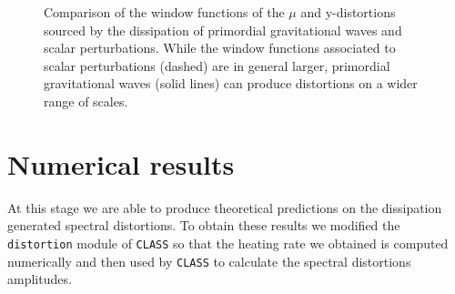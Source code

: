 \begin{figure}
    \centering
{}
\caption{Comparison of the window functions of the $\mu$ and y-distortions sourced by the dissipation of primordial gravitational waves and scalar perturbations. While the window functions associated to scalar perturbations (dashed) are in general larger, primordial gravitational waves (solid lines) can produce distortions on a wider range of scales.}
\label{fig:st_window}
\end{figure}

\section{Numerical results}\label{sec:num_results}
At this stage we are able to produce theoretical predictions on the dissipation generated spectral distortions. To obtain these results we modified the \texttt{distortion} module of \texttt{CLASS} so that the heating rate we obtained is computed numerically and then used by \texttt{CLASS} to calculate the spectral distortions amplitudes.

